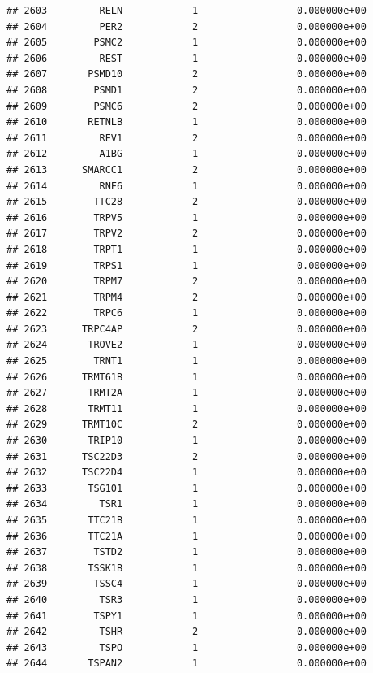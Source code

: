 \documentclass[
]{article}
\begin{document}
\begin{verbatim}
## 2603         RELN            1                 0.000000e+00
## 2604         PER2            2                 0.000000e+00
## 2605        PSMC2            1                 0.000000e+00
## 2606         REST            1                 0.000000e+00
## 2607       PSMD10            2                 0.000000e+00
## 2608        PSMD1            2                 0.000000e+00
## 2609        PSMC6            2                 0.000000e+00
## 2610       RETNLB            1                 0.000000e+00
## 2611         REV1            2                 0.000000e+00
## 2612         A1BG            1                 0.000000e+00
## 2613      SMARCC1            2                 0.000000e+00
## 2614         RNF6            1                 0.000000e+00
## 2615        TTC28            2                 0.000000e+00
## 2616        TRPV5            1                 0.000000e+00
## 2617        TRPV2            2                 0.000000e+00
## 2618        TRPT1            1                 0.000000e+00
## 2619        TRPS1            1                 0.000000e+00
## 2620        TRPM7            2                 0.000000e+00
## 2621        TRPM4            2                 0.000000e+00
## 2622        TRPC6            1                 0.000000e+00
## 2623      TRPC4AP            2                 0.000000e+00
## 2624       TROVE2            1                 0.000000e+00
## 2625        TRNT1            1                 0.000000e+00
## 2626      TRMT61B            1                 0.000000e+00
## 2627       TRMT2A            1                 0.000000e+00
## 2628       TRMT11            1                 0.000000e+00
## 2629      TRMT10C            2                 0.000000e+00
## 2630       TRIP10            1                 0.000000e+00
## 2631      TSC22D3            2                 0.000000e+00
## 2632      TSC22D4            1                 0.000000e+00
## 2633       TSG101            1                 0.000000e+00
## 2634         TSR1            1                 0.000000e+00
## 2635       TTC21B            1                 0.000000e+00
## 2636       TTC21A            1                 0.000000e+00
## 2637        TSTD2            1                 0.000000e+00
## 2638       TSSK1B            1                 0.000000e+00
## 2639        TSSC4            1                 0.000000e+00
## 2640         TSR3            1                 0.000000e+00
## 2641        TSPY1            1                 0.000000e+00
## 2642         TSHR            2                 0.000000e+00
## 2643         TSPO            1                 0.000000e+00
## 2644       TSPAN2            1                 0.000000e+00

\end{verbatim}
\end{document}
